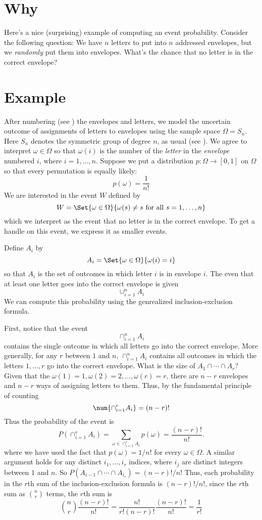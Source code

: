 
\section*{Why}

Here's a nice (surprising) example of computing an event probability.
Consider the following question:
We have $n$ letters to put into $n$ addressed envelopes, but we \textit{randomly} put them into envelopes.
What's the chance that no letter is in the correct envelope?

\section*{Example}

After numbering (see ) the envelopes and letters, we model the uncertain outcome of assignments of letters to envelopes using the sample space $\Omega  = S_n$.
Here $S_n$ denotes the symmetric group of degree $n$, as usual (see ).
We agree to interpret $\omega  \in \Omega $ so that $\omega (i)$ is the number of the \textit{letter} in the \textit{envelope} numbered $i$, where $i = 1,\dots , n$.
Suppose we put a distribution $p: \Omega  \to [0,1]$ on $\Omega $ so that every permutation is equally likely:
\[
p(\omega ) = \frac{1}{n!}
\]
We are interested in the event $W$ defined by
\[
W = \Set{\omega  \in \Omega }{\omega (s) \neq s \text{ for all } s = 1, \dots , n}
\]
which we interpret as the event that no letter is in the correct envelope.
To get a handle on this event, we express it as smaller events.

Define $A_i$ by
\[
A_i = \Set{\omega  \in \Omega }{\omega (i) = i}
\]
so that $A_i$ is the set of outcomes in which letter $i$ is in envelope $i$.
The even that at least one letter goes into the correct envelope is given
\[
\cup_{i = 1}^{n} A_i
\]
We can compute this probability using the genrealized inclusion-exclusion formula.

First, notice that the event
\[
\cap _{i = 1}^{n} A_i
\]
contains the single outcome in which all letters go into the correct envelope.
More generally, for any $r$ between $1$ and $n$, $\cap _{i = 1}^{n} A_i$ contains all outcomes in which the letters $1, \dots , r$ go into the correct envelope.
What is the size of $A_1 \cap  \cdots \cap  A_r$?
Given that the $\omega (1) = 1, \omega (2) = 2, \dots , \omega (r) = r$, there are $n-r$ envelopes and $n-r$ ways of assigning letters to them.
Thus, by the fundamental principle of counting
\[
\num{\cap _{i = 1}^{r} A_i} = (n-r)!
\]
Thus the probability of the event is
\[
P(\cap _{i = 1}^{r} A_i) = \sum_{\omega  \in \cap _{i = 1}^{r} A_i} p(\omega ) = \frac{(n-r)!}{n!}.
\]
where we have used the fact that $p(\omega ) = 1/n!$ for every $\omega  \in \Omega $.
A similar argument holds for any distinct $i_1, \dots , i_r$ indices, where $i_j$ are distinct integers between $1$ and $n$.
So $P(A_{i-1} \cap  \cdots \cap  A_{i_r}) = (n-r)!/n!$
Thus, each probability in the $r$th sum of the inclusion-exclusion formula is $(n-r)!/n!$, since the $r$th sum as ${n \choose r}$ terms, the $r$th sum is
\[
{n \choose r} \frac{(n-r)!}{n!} = \frac{n!}{r!(n-r)!}\frac{(n-r)!}{n!} = \frac{1}{r!}
\]

